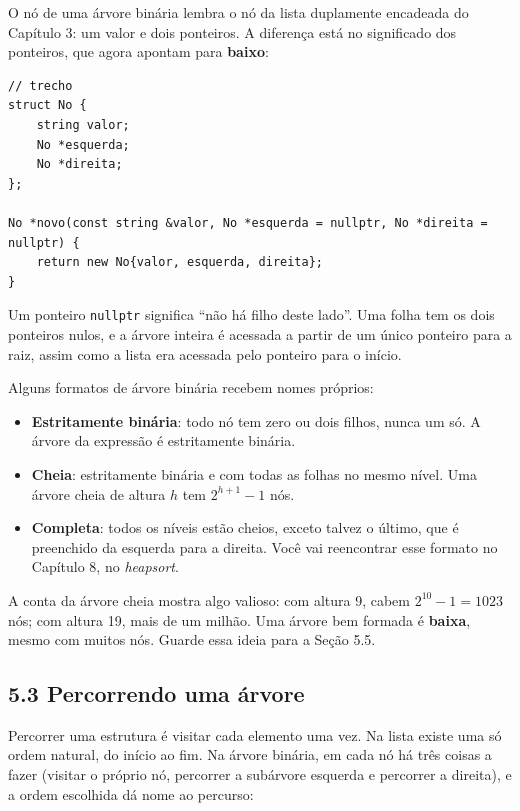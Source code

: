 O nó de uma árvore binária lembra o nó da lista duplamente encadeada do Capítulo 3: um valor e dois ponteiros. A diferença está no significado dos ponteiros, que agora apontam para \textbf{baixo}:

\begin{codigo}
\begin{Verbatim}[breaklines=true, breaksymbolleft={}, fontsize=\footnotesize]
// trecho
struct No {
    string valor;
    No *esquerda;
    No *direita;
};

No *novo(const string &valor, No *esquerda = nullptr, No *direita = nullptr) {
    return new No{valor, esquerda, direita};
}
\end{Verbatim}
\end{codigo}

Um ponteiro \texttt{nullptr} significa ``não há filho deste lado''. Uma folha tem os dois ponteiros nulos, e a árvore inteira é acessada a partir de um único ponteiro para a raiz, assim como a lista era acessada pelo ponteiro para o início.

Alguns formatos de árvore binária recebem nomes próprios:

\begin{itemize}
  \item \textbf{Estritamente binária}: todo nó tem zero ou dois filhos, nunca um só. A árvore da expressão é estritamente binária.
  \item \textbf{Cheia}: estritamente binária e com todas as folhas no mesmo nível. Uma árvore cheia de altura $h$ tem $2^{h+1} - 1$ nós.
  \item \textbf{Completa}: todos os níveis estão cheios, exceto talvez o último, que é preenchido da esquerda para a direita. Você vai reencontrar esse formato no Capítulo 8, no \textit{heapsort}.
\end{itemize}

A conta da árvore cheia mostra algo valioso: com altura 9, cabem $2^{10} - 1 = 1023$ nós; com altura 19, mais de um milhão. Uma árvore bem formada é \textbf{baixa}, mesmo com muitos nós. Guarde essa ideia para a Seção 5.5.

\subsection{5.3 Percorrendo uma árvore}

Percorrer uma estrutura é visitar cada elemento uma vez. Na lista existe uma só ordem natural, do início ao fim. Na árvore binária, em cada nó há três coisas a fazer (visitar o próprio nó, percorrer a subárvore esquerda e percorrer a direita), e a ordem escolhida dá nome ao percurso:

